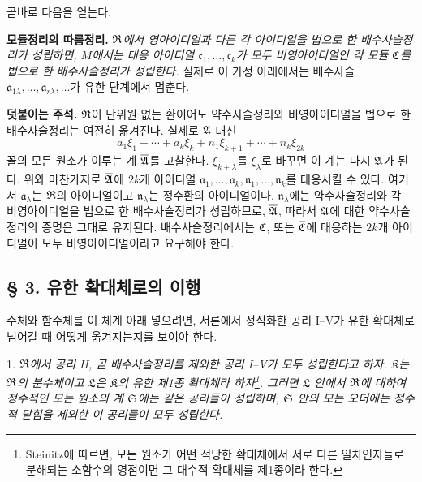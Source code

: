 곧바로 다음을 얻는다.

\medskip
\noindent\textbf{모듈정리의 따름정리.} \emph{\(\mathfrak{R}\)에서 영아이디얼과 다른 각 아이디얼을 법으로 한 배수사슬정리가 성립하면, \(M\)에서는 대응 아이디얼 \(\mathfrak c_1,\ldots,\mathfrak c_k\)가 모두 비영아이디얼인 각 모듈 \(\mC\)를 법으로 한 배수사슬정리가 성립한다.}
실제로 이 가정 아래에서는 배수사슬 \(\mathfrak a_{1\lambda},\ldots,\mathfrak a_{r\lambda},\ldots\)가 유한 단계에서 멈춘다.

\medskip
\noindent\textbf{덧붙이는 주석.} \(\mathfrak{R}\)이 단위원 없는 환이어도 약수사슬정리와 비영아이디얼을 법으로 한 배수사슬정리는 여전히 옮겨진다. 실제로 \(\mathfrak A\) 대신
\[
        a_1\xi_1+\cdots+a_k\xi_k+n_1\xi_{k+1}+\cdots+n_k\xi_{2k}
\]
꼴의 모든 원소가 이루는 계 \(\overline{\mathfrak A}\)를 고찰한다. \(\xi_{k+\lambda}\)를 \(\xi_\lambda\)로 바꾸면 이 계는 다시 \(\mathfrak A\)가 된다. 위와 마찬가지로 \(\overline{\mathfrak A}\)에 \(2k\)개 아이디얼 \(\mathfrak a_1,\ldots,\mathfrak a_k,\mathfrak n_1,\ldots,\mathfrak n_k\)를 대응시킬 수 있다. 여기서 \(\mathfrak a_\lambda\)는 \(\mathfrak{R}\)의 아이디얼이고 \(\mathfrak n_\lambda\)는 정수환의 아이디얼이다. \(\mathfrak n_\lambda\)에는 약수사슬정리와 각 비영아이디얼을 법으로 한 배수사슬정리가 성립하므로, \(\overline{\mathfrak A}\), 따라서 \(\mathfrak A\)에 대한 약수사슬정리의 증명은 그대로 유지된다. 배수사슬정리에서는 \(\mC\), 또는 \(\overline{\mC}\)에 대응하는 \(2k\)개 아이디얼이 모두 비영아이디얼이라고 요구해야 한다.

\providecommand{\mK}{\mathfrak{K}}
\providecommand{\mL}{\mathfrak{L}}
\providecommand{\mT}{\mathfrak{T}}
\providecommand{\mC}{\mathfrak{C}}
\providecommand{\mF}{\mathfrak{F}}
\providecommand{\ma}{\mathfrak{a}}
\providecommand{\mb}{\mathfrak{b}}
\providecommand{\mc}{\mathfrak{c}}
\providecommand{\md}{\mathfrak{d}}
\providecommand{\me}{\mathfrak{e}}
\providecommand{\mf}{\mathfrak{f}}
\providecommand{\mm}{\mathfrak{m}}
\providecommand{\mn}{\mathfrak{n}}
\providecommand{\mo}{\mathfrak{o}}
\providecommand{\mq}{\mathfrak{q}}
\providecommand{\mt}{\mathfrak{t}}
\providecommand{\mv}{\mathfrak{v}}
\providecommand{\mpideal}{\mathfrak{p}}

\subsection*{§ 3. 유한 확대체로의 이행}

수체와 함수체를 이 체계 아래 넣으려면, 서론에서 정식화한 공리 I--V가 유한 확대체로 넘어갈 때 어떻게 옮겨지는지를 보여야 한다.

1. \emph{\(\mathfrak{R}\)에서 공리 II, 곧 배수사슬정리를 제외한 공리 I--V가 모두 성립한다고 하자. \(\mK\)는 \(\mathfrak{R}\)의 분수체이고 \(\mL\)은 \(\mK\)의 유한 제1종 확대체라 하자\footnote{Steinitz에 따르면, 모든 원소가 어떤 적당한 확대체에서 서로 다른 일차인자들로 분해되는 소함수의 영점이면 그 대수적 확대체를 \glqq{}제1종\grqq{}이라 한다.}. 그러면 \(\mL\) 안에서 \(\mathfrak{R}\)에 대하여 정수적인 모든 원소의 계 \(\mathfrak S\)에는 같은 공리들이 성립하며, \(\mathfrak S\) 안의 모든 오더에는 정수적 닫힘을 제외한 이 공리들이 모두 성립한다.}

